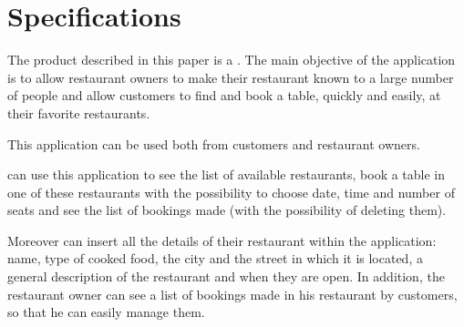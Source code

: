 \chapter{Specifications}

The product described in this paper is a . The main objective of the application is to allow restaurant
owners to make their restaurant known to a large number of people and allow
customers to find and book a table, quickly and easily, at their favorite
restaurants.

This application can be used both from customers and restaurant owners.

 can use this application to see the list of available
restaurants, book a table in one of these restaurants with the possibility to
choose date, time and number of seats and see the list of bookings made (with
the possibility of deleting them).

Moreover  can insert all the details of their
restaurant within the application: name, type of cooked food, the city and the
street in which it is located, a general description of the restaurant and when
they are open. In addition, the restaurant owner can see a list of bookings made
in his restaurant by customers, so that he can easily manage them.
